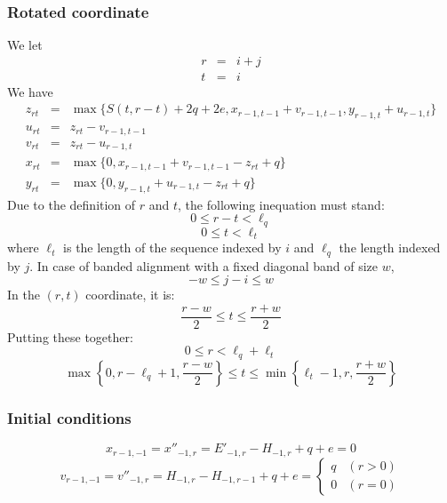\documentclass[10pt]{article}
\begin{document}
\subsubsection{Rotated coordinate}

We let
\begin{eqnarray*}
r&=&i+j\\
t&=&i
\end{eqnarray*}
We have
\begin{eqnarray*}
z_{rt}&=&\max\{S(t,r-t)+2q+2e,x_{r-1,t-1}+v_{r-1,t-1},y_{r-1,t}+u_{r-1,t}\}\\
u_{rt}&=&z_{rt}-v_{r-1,t-1}\\
v_{rt}&=&z_{rt}-u_{r-1,t}\\
x_{rt}&=&\max\{0,x_{r-1,t-1}+v_{r-1,t-1}-z_{rt}+q\}\\
y_{rt}&=&\max\{0,y_{r-1,t}+u_{r-1,t}-z_{rt}+q\}
\end{eqnarray*}
Due to the definition of $r$ and $t$, the following inequation must stand:
\[0\le r-t<\ell_q\]
\[0\le t<\ell_t\]
where $\ell_t$ is the length of the sequence indexed by $i$ and $\ell_q$ the
length indexed by $j$. In case of banded alignment with a fixed diagonal band
of size $w$,
\[-w\le j-i\le w\]
In the $(r,t)$ coordinate, it is:
\[\frac{r-w}{2}\le t\le \frac{r+w}{2}\]
Putting these together:
\[0\le r< \ell_q+\ell_t\]
\[\max\left\{0,r-\ell_q+1,\frac{r-w}{2}\right\}\le t\le\min\left\{\ell_t-1,r,\frac{r+w}{2}\right\}\]

\subsubsection{Initial conditions}
\[x_{r-1,-1}=x''_{-1,r}=E'_{-1,r}-H_{-1,r}+q+e=0\]
\[v_{r-1,-1}=v''_{-1,r}=H_{-1,r}-H_{-1,r-1}+q+e=\left\{\begin{array}{ll}
  q & (r>0) \\
  0 & (r=0)
\end{array}\right.\]
\end{document}

